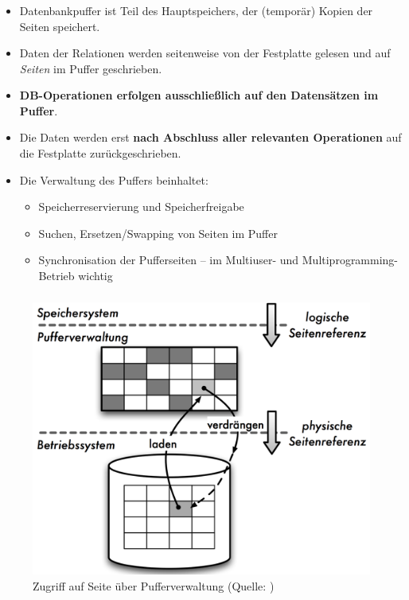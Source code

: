 \begin{frame}
\frametitle{\insertsection}
\framesubtitle{\insertsubsection}
\begin{itemize}
	\item Datenbankpuffer ist Teil des Hauptspeichers, der (tempor\"ar) Kopien der Seiten speichert.
	\pause
	\abs
	\item Daten der Relationen werden seitenweise von der Festplatte gelesen und auf \textit{Seiten} im Puffer geschrieben. 
	\item \textbf{DB-Operationen erfolgen ausschlie\ss lich auf den Datens\"atzen im Puffer}.
	\item Die Daten werden erst \textbf{nach Abschluss aller relevanten Operationen} auf die Festplatte zur\"uckgeschrieben.\\[6pt]
	\pause
	\abs
	\item Die Verwaltung des Puffers beinhaltet:
	\begin{itemize}
		\item Speicherreservierung und Speicherfreigabe
		\item Suchen, Ersetzen/Swapping von Seiten im Puffer
		\item Synchronisation der Pufferseiten -- im Multiuser- und Multiprogramming-Betrieb wichtig
	\end{itemize}
\end{itemize}    
\end{frame}

\begin{frame}
\frametitle{\insertsection}
\framesubtitle{\insertsubsection}
\begin{figure}
\includegraphics[scale=0.13]{img/buffer.png}
\caption{Zugriff auf Seite über Pufferverwaltung (Quelle: \cite[S. 31]{SSH11})}
\end{figure}
\end{frame}

